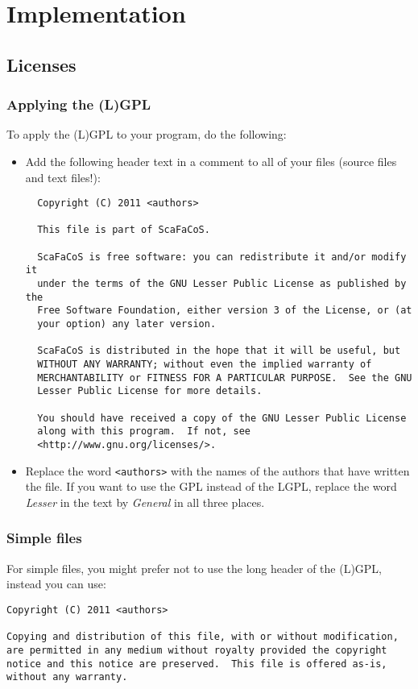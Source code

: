 \chapter{Implementation}
\label{cha:implementation}


\section{Licenses}
\label{sec:licenses}

\subsection{Applying the (L)GPL}

To apply the (L)GPL to your program, do the following:

\begin{itemize}
\item Add the following header text in a comment to all of your files
  (source files and text files!):

\begin{verbatim}
  Copyright (C) 2011 <authors>

  This file is part of ScaFaCoS.

  ScaFaCoS is free software: you can redistribute it and/or modify it
  under the terms of the GNU Lesser Public License as published by the
  Free Software Foundation, either version 3 of the License, or (at
  your option) any later version.

  ScaFaCoS is distributed in the hope that it will be useful, but
  WITHOUT ANY WARRANTY; without even the implied warranty of
  MERCHANTABILITY or FITNESS FOR A PARTICULAR PURPOSE.  See the GNU
  Lesser Public License for more details.

  You should have received a copy of the GNU Lesser Public License
  along with this program.  If not, see
  <http://www.gnu.org/licenses/>.
\end{verbatim}

\item Replace the word \texttt{<authors>} with the names of the
  authors that have written the file.  If you want to use the GPL
  instead of the LGPL, replace the word \textit{Lesser} in the text by
  \textit{General} in all three places.
\end{itemize}

\subsection{Simple files}

For simple files, you might prefer not to use the long header of the
(L)GPL, instead you can use:

\begin{verbatim}
Copyright (C) 2011 <authors>

Copying and distribution of this file, with or without modification,
are permitted in any medium without royalty provided the copyright
notice and this notice are preserved.  This file is offered as-is,
without any warranty.
\end{verbatim}
